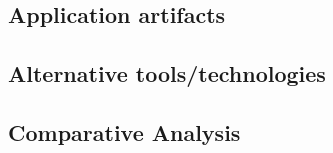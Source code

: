 \documentclass[a4paper, 11pt]{report}
\begin{document}
\subsection{Application artifacts}



\subsection{Alternative tools/technologies}
\subsection{Comparative Analysis}




\newpage
 


\end{document}
